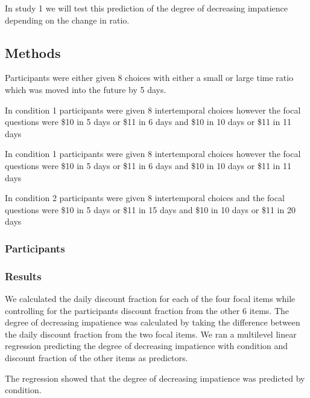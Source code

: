 \documentclass[]{article}
\begin{document}
In study 1 we will test this prediction of the degree of decreasing impatience depending on the change in ratio.

\subsection{Methods}
Participants were either given 8 choices with either a small or large time ratio which was moved into the future by 5 days. 

In condition 1 participants were given 8 intertemporal choices however the focal questions were 
\$10 in 5 days or \$11 in 6 days
and 
\$10 in 10 days or \$11 in 11 days

In condition 1 participants were given 8 intertemporal choices however the focal questions were 
\$10 in 5 days or \$11 in 6 days
and 
\$10 in 10 days or \$11 in 11 days

In condition 2 participants were given 8 intertemporal choices and the focal questions were 
\$10 in 5 days or \$11 in 15 days
and 
\$10 in 10 days or \$11 in 20 days


\subsubsection{Participants}


\subsubsection{Results}

We calculated the daily discount fraction for each of the four focal items while controlling for the participants discount fraction from the other 6 items. 
The degree of decreasing impatience was calculated by taking the difference between the daily discount fraction from the two focal items. 
We ran a multilevel linear regression predicting the degree of decreasing impatience with condition and discount fraction of the other items as predictors. 

The regression showed that the degree of decreasing impatience was predicted by condition.  
\end{document}
